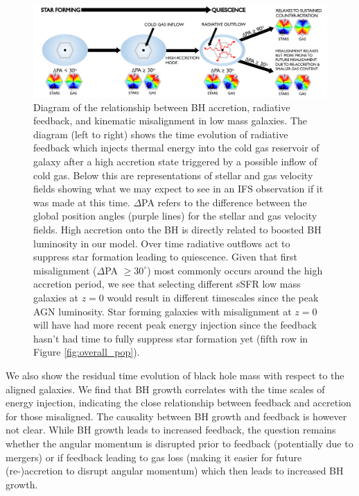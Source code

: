\documentclass[fleqn,usenatbib]{mnras}
\begin{document}
\begin{figure}
	\includegraphics[width=\linewidth]{quasar_mode_feedback_compressed.pdf}
    \caption{Diagram of the relationship between BH accretion, radiative feedback, and kinematic misalignment in low mass galaxies. The diagram (left to right) shows the time evolution of radiative feedback which injects thermal energy into the cold gas reservoir of galaxy after a high accretion state triggered by a possible inflow of cold gas. Below this are representations of stellar and gas velocity fields showing what we may expect to see in an IFS observation if it was made at this time. $\Delta$PA refers to the difference between the global position angles (purple lines) for the stellar and gas velocity fields. High accretion onto the BH is directly related to boosted BH luminosity in our model. Over time radiative outflows act to suppress star formation leading to quiescence. Given that first misalignment ($\Delta$PA $\geq 30^{\circ}$) most commonly occurs around the high accretion period, we see that selecting different sSFR low mass galaxies at $z=0$ would result in different timescales since the peak AGN luminosity. Star forming galaxies with misalignment at $z=0$ will have had more recent peak energy injection since the feedback hasn't had time to fully suppress star formation yet (fifth row in Figure \ref{fig:overall_pop}).}
    \label{fig:diagram}
\end{figure}

We also show the residual time evolution of black hole mass with respect to the aligned galaxies. We find that BH growth correlates with the time scales of energy injection, indicating the close relationship between feedback and accretion for those misaligned. The causality between BH growth and feedback is however not clear. While BH growth leads to increased feedback, the question remains whether the angular momentum is disrupted prior to feedback (potentially due to mergers) or if feedback leading to gas loss (making it easier for future (re-)accretion to disrupt angular momentum) which then leads to increased BH growth.
\end{document}
